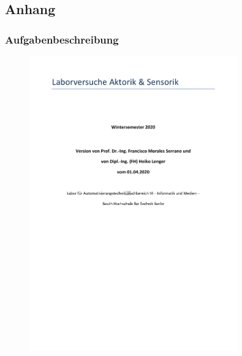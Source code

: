 \subsection{Anhang}

\subsubsection{Aufgabenbeschreibung}
\begin{figure}[H]
    \centering
    \includegraphics[page=5, width=0.8\textwidth]{../Aufgabenstellung.pdf}
    \label{fig:Aufgabenstellung Labor 2.1}
\end{figure}

